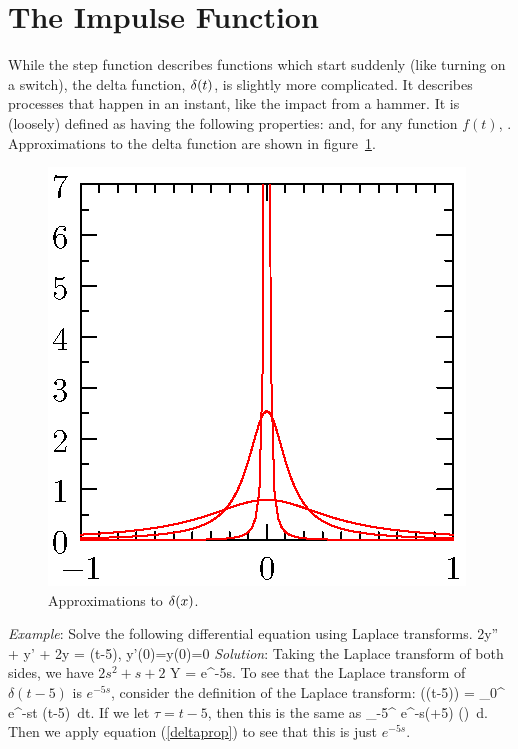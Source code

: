 \documentclass[12pt]{book}
\begin{document}
\section{The Impulse Function}
While the step function describes functions which start suddenly (like turning 
on a switch), the delta function, $\delta(t)$, is slightly more complicated. It 
describes processes that happen in an instant, like the impact from a hammer. 
It is (loosely) defined as having the following properties:
\be
{}
\ee
and, for any function $f(t)$,
\be \label{deltaprop}
.
\ee
Approximations to the delta function are shown in figure~\ref{deltafig}.
\begin{figure}[htbp]
  \begin{center}
    \includegraphics{201/delta}
    \caption{Approximations to $\delta(x)$.}
    \label{deltafig}
  \end{center}
\end{figure}


\noindent\emph{Example}: Solve the following differential equation using
Laplace transforms.
\bee
2y'' + y' + 2y = \delta(t-5), \qquad y'(0)=y(0)=0
\eee
\emph{Solution}: Taking the Laplace transform of both sides, we have
\be \label{exeq1}
\(2s^2 + s +2\) Y = e^{-5s}.
\ee
To see that the Laplace transform of $\delta(t-5)$ is $e^{-5s}$, consider the 
definition of the Laplace transform:
\be
{}(\delta(t-5)) = \int_0^{\infty} e^{-st} \delta(t-5)\, dt.
\ee
If we let $\tau = t-5$, then this is the same as
\bee
\int_{-5}^{\infty} e^{-s(\tau+5)} \delta(\tau)\, d\tau .
\eee
Then we apply equation (\ref{deltaprop}) to see that this is just $e^{-5s}$. 
\end{document}
